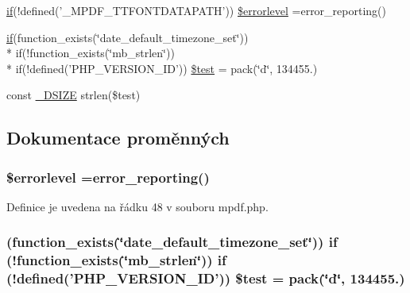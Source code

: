 \begin{DoxyCompactItemize}
\hyperlink{pdf__parser_8php_af8105e84b42a9ceda5357caeb6c4760b}{if}(!defined('\-\_\-\-M\-P\-D\-F\-\_\-\-T\-T\-F\-O\-N\-T\-D\-A\-T\-A\-P\-A\-T\-H')) \hyperlink{mpdf_8php_a9e8850ef4e92b5e07274a5b7aef1396d}{\$errorlevel} =error\-\_\-reporting()
\item 
\hyperlink{pdf__parser_8php_af8105e84b42a9ceda5357caeb6c4760b}{if}(function\-\_\-exists(\char`\"{}date\-\_\-default\-\_\-timezone\-\_\-set\char`\"{})) \\*
if(!function\-\_\-exists(\char`\"{}mb\-\_\-strlen\char`\"{})) \\*
if(!defined('P\-H\-P\-\_\-\-V\-E\-R\-S\-I\-O\-N\-\_\-\-I\-D')) \hyperlink{mpdf_8php_aa3a073f6e555dba8cb7f8fda5f03fefa}{\$test} = pack(\char`\"{}d\char`\"{}, 134455.)
\item 
const \hyperlink{mpdf_8php_a7966b46681b5b845bc4ed993f3885b0b}{\-\_\-\-D\-S\-I\-Z\-E} strlen(\$test)
\end{DoxyCompactItemize}


\subsection{Dokumentace proměnných}
\hypertarget{mpdf_8php_a9e8850ef4e92b5e07274a5b7aef1396d}{
\subsubsection[{\$errorlevel}]{\setlength{\rightskip}{0pt plus 5cm}\$errorlevel =error\-\_\-reporting()}}\label{mpdf_8php_a9e8850ef4e92b5e07274a5b7aef1396d}


Definice je uvedena na řádku 48 v souboru mpdf.\-php.

\hypertarget{mpdf_8php_aa3a073f6e555dba8cb7f8fda5f03fefa}{
\subsubsection[{\$test}]{ (function\-\_\-exists(\char`\"{}date\-\_\-default\-\_\-timezone\-\_\-set\char`\"{})) if (!function\-\_\-exists(\char`\"{}mb\-\_\-strlen\char`\"{})) if (!defined('P\-H\-P\-\_\-\-V\-E\-R\-S\-I\-O\-N\-\_\-\-I\-D')) \$test = pack(\char`\"{}d\char`\"{}, 134455.)}}\label{mpdf_8php_aa3a073f6e555dba8cb7f8fda5f03fefa}


